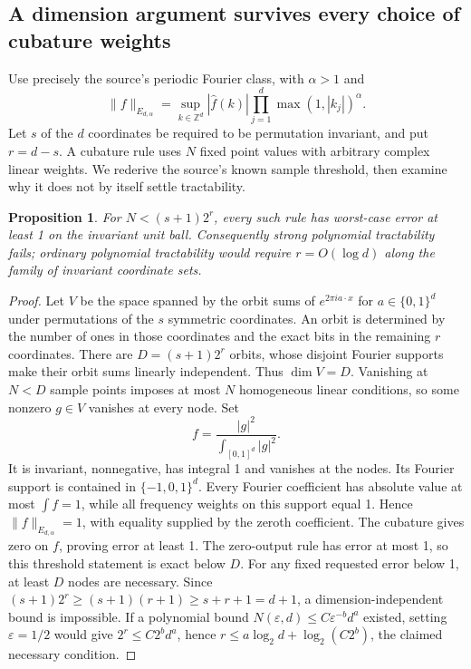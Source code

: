 \documentclass[11pt]{article}
\newtheorem{proposition}{Proposition}
\begin{document}
\subsection{A dimension argument survives every choice of cubature weights}
Use precisely the source's periodic Fourier class, with $\alpha>1$ and
\[
\|f\|_{E_{d,\alpha}}=\sup_{k\in\mathbb Z^d}|\widehat f(k)|\prod_{j=1}^d\max(1,|k_j|)^\alpha.
\]
Let $s$ of the $d$ coordinates be required to be permutation invariant, and put $r=d-s$. A cubature rule uses $N$ fixed point values with arbitrary complex linear weights. We rederive the source's known sample threshold, then examine why it does not by itself settle tractability.
\begin{proposition}
For $N<(s+1)2^r$, every such rule has worst-case error at least 1 on the invariant unit ball. Consequently strong polynomial tractability fails; ordinary polynomial tractability would require $r=O(\log d)$ along the family of invariant coordinate sets.
\end{proposition}
\begin{proof}
Let $V$ be the space spanned by the orbit sums of $e^{2\pi i a\cdot x}$ for $a\in\{0,1\}^d$ under permutations of the $s$ symmetric coordinates. An orbit is determined by the number of ones in those coordinates and the exact bits in the remaining $r$ coordinates. There are $D=(s+1)2^r$ orbits, whose disjoint Fourier supports make their orbit sums linearly independent. Thus $\dim V=D$.
Vanishing at $N<D$ sample points imposes at most $N$ homogeneous linear conditions, so some nonzero $g\in V$ vanishes at every node. Set
\[
f=\frac{|g|^2}{\int_{[0,1]^d}|g|^2}.
\]
It is invariant, nonnegative, has integral 1 and vanishes at the nodes. Its Fourier support is contained in $\{-1,0,1\}^d$. Every Fourier coefficient has absolute value at most $\int f=1$, while all frequency weights on this support equal 1. Hence $\|f\|_{E_{d,\alpha}}=1$, with equality supplied by the zeroth coefficient. The cubature gives zero on $f$, proving error at least 1. The zero-output rule has error at most 1, so this threshold statement is exact below $D$.
For any fixed requested error below 1, at least $D$ nodes are necessary. Since $(s+1)2^r\ge(s+1)(r+1)\ge s+r+1=d+1$, a dimension-independent bound is impossible. If a polynomial bound $N(\varepsilon,d)\le C\varepsilon^{-b}d^a$ existed, setting $\varepsilon=1/2$ would give $2^r\le C2^bd^a$, hence $r\le a\log_2 d+\log_2(C2^b)$, the claimed necessary condition.
\end{proof}
\end{document}
